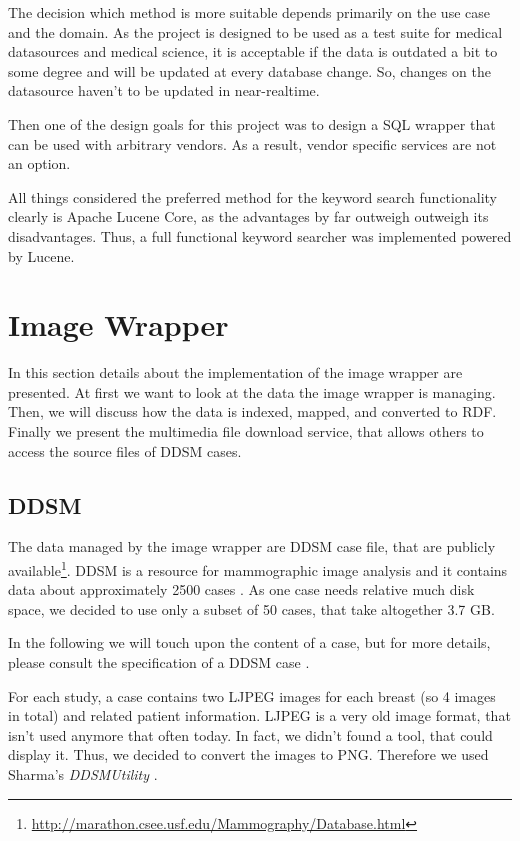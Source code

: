 The decision which method is more suitable depends primarily on the use case and the domain. As the project is designed to be used as a test suite for medical datasources and medical science, it is acceptable if the data is outdated a bit to some degree and will be updated at every database change. So, changes on the datasource haven't to be updated in near-realtime.

Then one of the design goals for this project was to design a SQL wrapper that can be used with arbitrary vendors. As a result, vendor specific services are not an option.

All things considered the preferred method for the keyword search functionality clearly is Apache Lucene Core, as the advantages by far outweigh outweigh its disadvantages. Thus, a full functional keyword searcher was implemented powered by Lucene.


\section{Image Wrapper}
 
In this section details about the implementation of the image wrapper are presented. 
At first we want to look at the data the image wrapper is managing. Then, we will discuss how the data is indexed, mapped, and converted to RDF. Finally we present the multimedia file download service, that allows others to access the source files of DDSM cases.

\subsection{DDSM}

The data managed by the image wrapper are DDSM case file, that are publicly available\footnote{\url{http://marathon.csee.usf.edu/Mammography/Database.html}}.
DDSM is a resource for mammographic image analysis and it contains data about approximately 2500 cases \cite{DDSM}. As one case needs relative much disk space, we decided to use only a subset of 50 cases, that take altogether 3.7 GB.

In the following we will touch upon the content of a case, but for more details, please consult the specification of a DDSM case \cite{DDSM_CASE_SPEC}. 

For each study, a case contains two LJPEG images for each breast (so 4 images in total) and related patient information. LJPEG is a very old image format, that isn't used anymore that often today. In fact, we didn't found a tool, that could display it. Thus, we decided to convert the images to PNG. Therefore we used Sharma's \emph{DDSMUtility} \cite{DDSM_UTILITY}.

